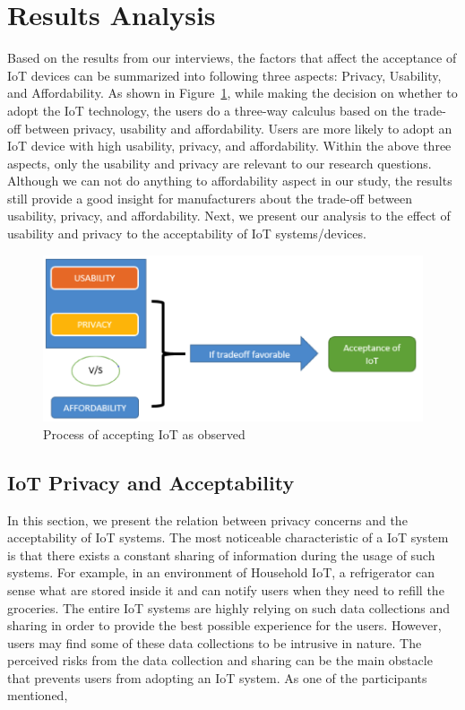 \section{Results Analysis}
Based on the results from our interviews, the factors that affect the acceptance of IoT devices can be summarized into following three aspects: Privacy, Usability, and Affordability. As shown in Figure~\ref{fig:AcceptingProcess}, while making the decision on whether to adopt the IoT technology, the users do a three-way calculus based on the trade-off between privacy, usability and affordability. Users are more likely to adopt an IoT device with high usability, privacy, and affordability. Within the above three aspects, only the usability and privacy  are relevant to our research questions. Although we can not do anything to affordability aspect in our study, the results still provide a good insight for manufacturers about the trade-off between usability, privacy, and affordability. Next, we present our analysis to the effect of usability and privacy to the acceptability of IoT systems/devices.

\begin{figure}[htb]
	\centering
	\includegraphics[width=0.6\columnwidth]{figures/AcceptingProcess.png}
	\caption{Process of accepting IoT as observed}
	\label{fig:AcceptingProcess}
\end{figure}

\subsection{IoT Privacy and Acceptability}
In this section, we present the relation between privacy concerns and the acceptability of IoT systems. The most noticeable characteristic of a IoT system is that there exists a constant sharing of information during the usage of such systems. For example, in an environment of Household IoT, a refrigerator can sense what are stored inside it and can notify users when they need to refill the groceries. The entire IoT systems are highly relying on such data collections and sharing in order to provide the best possible experience for the users. However, users may find some of these data collections to be intrusive in nature. The perceived risks from the data collection and sharing can be the main obstacle that prevents users from adopting an IoT system. As one of the participants mentioned, 

